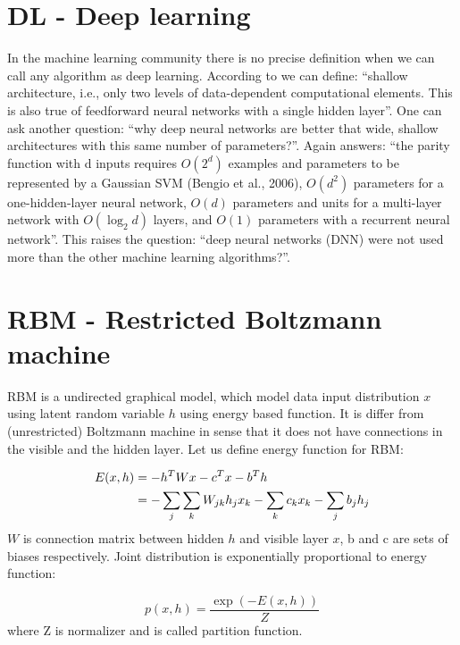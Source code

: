 \section{DL - Deep learning}
In the machine learning community there is no precise definition when we can call any algorithm as deep learning. According to \textcite{bengio_greedy_2007} we can define: ``shallow architecture, i.e., only two levels of data-dependent computational elements. This is also true of feedforward neural networks with a single hidden layer''. One can ask another question: ``why deep neural networks are better that wide, shallow architectures with this same number of parameters?''. Again \textcite{bengio_greedy_2007} answers: ``the parity function with d inputs
requires $O(2^d)$ examples and parameters to be represented by a Gaussian SVM (Bengio et al., 2006),
$O(d^2)$ parameters for a one-hidden-layer neural network, $O(d)$ parameters and units for a multi-layer
network with $O(\log_2 d)$ layers, and $O(1)$ parameters with a recurrent neural network''.
This raises the question: ``deep neural networks (DNN) were not used more than the other machine learning algorithms?''. 


\section{RBM - Restricted Boltzmann machine}

RBM is a undirected graphical model, which model data input distribution $x$ using latent random variable $h$ using energy based function. It is differ from (unrestricted) Boltzmann machine in sense that it does not have connections in the visible and the hidden layer. Let us define energy function for RBM:

\begin{align}
E(x,h) & = -h^TWx -c^Tx - b^Th \\
& =-\operatorname*{\sum}_j\operatorname*{\sum}_k W_{jk}h_jx_k-\operatorname*{\sum}_k c_k x_k - \operatorname*{\sum}_j b_j h_j
\end{align}
$W$ is connection matrix between hidden $h$ and visible layer $x$, b and c are sets of biases respectively. 
Joint distribution is exponentially proportional to energy function:

\begin{equation}
	p(x,h)=\frac{\exp(-E(x,h))}{Z}
\end{equation}
where Z is normalizer and is called partition function. 

